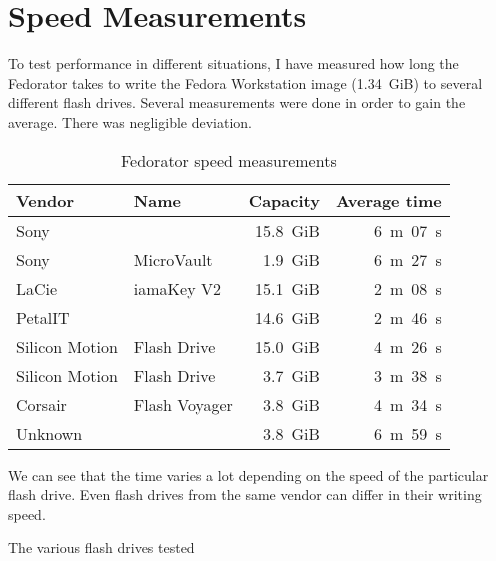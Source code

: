    \section{Speed Measurements}
        To test performance in different situations, I have measured how long the Fedorator takes to write the Fedora Workstation image (1.34~GiB) to several different flash drives.  Several measurements were done in order to gain the average.  There was negligible deviation.
        
        \begin{table}[htbp]
        \centering
        \caption{Fedorator speed measurements}
        \label{usb-duplicators}
            \begin{tabular}{ m{8em} m{8em} r r }
            \toprule
                \textbf{Vendor} & \textbf{Name} & \textbf{Capacity} & \textbf{Average time} \\
            \toprule
            
       Sony                         & & 15.8~GiB & 6~m~07~s \\
\hline Sony   & MicroVault            &  1.9~GiB & 6~m~27~s \\
\hline LaCie  & iamaKey V2            & 15.1~GiB & 2~m~08~s \\
\hline PetalIT                      & & 14.6~GiB & 2~m~46~s \\
\hline Silicon Motion & Flash Drive   & 15.0~GiB & 4~m~26~s \\
\hline Silicon Motion & Flash Drive   &  3.7~GiB & 3~m~38~s \\
\hline Corsair & Flash Voyager        &  3.8~GiB & 4~m~34~s \\
\hline Unknown\footnotemark
                                    & &  3.8~GiB & 6~m~59~s \\
\hline
            \end{tabular}
        \end{table}
        
        We can see that the time varies a lot depending on the speed of the particular flash drive.  Even flash drives from the same vendor can differ in their writing speed.
        
            {The various flash drives tested}
        
